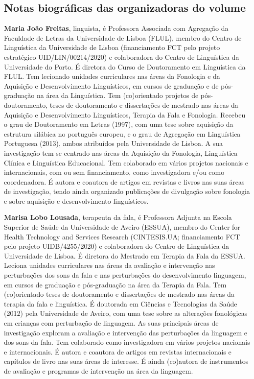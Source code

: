 \begin{refsection}
\section*{Notas biográficas das organizadoras do volume}
\textbf{Maria João Freitas}, linguista, é Professora Associada com Agregação da Faculdade de Letras da Universidade de Lisboa (FLUL), membro do Centro de Linguística da Universidade de Lisboa (financiamento FCT pelo projeto estratégico UID/LIN/00214/2020) e colaboradora do Centro de Linguística da Universidade do Porto. É diretora do Curso de Doutoramento em Linguística da FLUL. Tem lecionado unidades curriculares nas áreas da Fonologia e da Aquisição e Desenvolvimento Linguísticos, em cursos de graduação e de pós-graduação na área da Linguística. Tem (co)orientado projetos de pós-doutoramento, teses de doutoramento e dissertações de mestrado nas áreas da Aquisição e Desenvolvimento Linguísticos, Terapia da Fala e Fonologia. Recebeu o grau de Doutoramento em Letras (1997), com uma tese sobre aquisição da estrutura silábica no português europeu, e o grau de Agregação em Linguística Portuguesa (2013), ambos atribuídos pela Universidade de Lisboa. A sua investigação tem-se centrado nas áreas da Aquisição da Fonologia, Linguística Clínica e Linguística Educacional. Tem colaborado em vários projetos nacionais e internacionais, com ou sem financiamento, como investigadora e/ou como coordenadora. É autora e coautora de artigos em revistas e livros nas suas áreas de investigação, tendo ainda organizado publicações de divulgação sobre fonologia e sobre aquisição e desenvolvimento linguísticos.
\linebreak

\textbf{Marisa Lobo Lousada}, terapeuta da fala, é Professora Adjunta na Escola Superior de Saúde da Universidade de Aveiro (ESSUA), membro do Center for Health Technology and Services Research (CINTESIS.UA; financiamento FCT pelo projeto UIDB/4255/2020) e colaboradora do Centro de Linguística da Universidade de Lisboa. É diretora do Mestrado em Terapia da Fala da ESSUA. Leciona unidades curriculares nas áreas da avaliação e intervenção nas perturbações dos sons da fala e nas perturbações do desenvolvimento linguagem, em cursos de graduação e pós-graduação na área da Terapia da Fala. Tem (co)orientado teses de doutoramento e dissertações de mestrado nas áreas da terapia da fala e linguística. É doutorada em Ciências e Tecnologias da Saúde (2012) pela Universidade de Aveiro, com uma tese sobre as alterações fonológicas em crianças com perturbação de linguagem. As suas principais áreas de investigação exploram a avaliação e intervenção das perturbações da linguagem e dos sons da fala. Tem colaborado como investigadora em vários projetos nacionais e internacionais. É autora e coautora de artigos em revistas internacionais e capítulos de livro nas suas áreas de interesse. É ainda (co)autora de instrumentos de avaliação e programas de intervenção na área da linguagem. 
\linebreak


\end{refsection}
